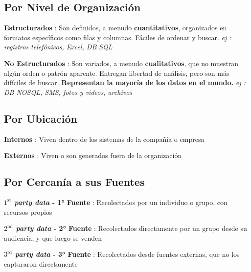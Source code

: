 \subsection{Por Nivel de Organización}
\begin{description}
    \item {\textbf{Estructurados} : Son definidos, a menudo \textbf{cuantitativos}, organizados en formatos específicos como filas y columnas. Fáciles de ordenar y buscar. \textit{ej : registros telefónicos, Excel, DB SQL}}
    \item {\textbf{No Estructurados} : Son variados, a menudo \textbf{cualitativos}, que no muestran algún orden o patrón aparente. Entregan libertad de análisis, pero son más difíciles de buscar. \textbf{Representan la mayoría de los datos en el mundo.} \textit{ej : DB NOSQL, SMS, fotos y videos, archivos}}
\end{description}

\subsection{Por Ubicación}
\begin{description}
    \item {\textbf{Internos} : Viven dentro de los sistemas de la compañía o empresa}
    \item {\textbf{Externos} : Viven o son generados fuera de la organización}
\end{description}

\subsection{Por Cercanía a sus Fuentes}
\begin{description}
    \item {\textbf{\textit{$1^{\text{st}}$ party data} - 1° Fuente} : Recolectados por un individuo o grupo, con recursos propios}
    \item {\textbf{\textit{$2^{\text{nd}}$ party data} - 2° Fuente} : Recolectados directamente por un grupo desde su audiencia, y que luego se venden}
    \item {\textbf{\textit{$3^{\text{rd}}$ party data} - 3° Fuente} : Recolectados desde fuentes externas, que no los capturaron directamente}
\end{description}



